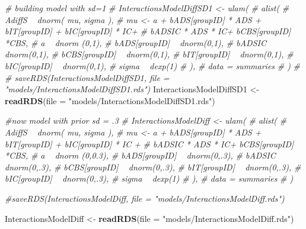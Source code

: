 \documentclass[10pt,dvipsnames,enabledeprecatedfontcommands]{scrartcl}
\newenvironment{Shaded}{\begin{snugshade}}{\end{snugshade}}
\newcommand{\KeywordTok}[1]{\textcolor[rgb]{0.13,0.29,0.53}{\textbf{#1}}}
\newcommand{\DataTypeTok}[1]{\textcolor[rgb]{0.13,0.29,0.53}{#1}}
\newcommand{\StringTok}[1]{\textcolor[rgb]{0.31,0.60,0.02}{#1}}
\newcommand{\CommentTok}[1]{\textcolor[rgb]{0.56,0.35,0.01}{\textit{#1}}}
\newcommand{\NormalTok}[1]{#1}
\begin{document}
\begin{Shaded}
\begin{Highlighting}[]
\CommentTok{# building model with sd=1}
\CommentTok{# InteractionsModelDiffSD1 <- ulam(}
\CommentTok{#   alist(}
\CommentTok{#     AdiffS ~ dnorm( mu, sigma ),}
\CommentTok{#     mu <- a + bADS[groupID] * ADS +  bIT[groupID] + bIC[groupID] * IC+}
\CommentTok{#     bADSIC * ADS * IC+ bCBS[groupID] *CBS,}
\CommentTok{#     a ~ dnorm (0,1),}
\CommentTok{#     bADS[groupID] ~ dnorm(0,1),}
\CommentTok{#     bADSIC ~ dnorm(0,1),}
\CommentTok{#     bCBS[groupID] ~ dnorm(0,1),}
\CommentTok{#     bIT[groupID] ~ dnorm(0,1),}
\CommentTok{#     bIC[groupID] ~ dnorm(0,1),}
\CommentTok{#     sigma  ~ dexp(1)}
\CommentTok{#   ), }
\CommentTok{#   data = summaries}
\CommentTok{# )}
\CommentTok{# }
\CommentTok{# saveRDS(InteractionsModelDiffSD1, file = "models/InteractionsModelDiffSD1.rds")}
\NormalTok{InteractionsModelDiffSD1 <-}\StringTok{ }\KeywordTok{readRDS}\NormalTok{(}\DataTypeTok{file =} \StringTok{"models/InteractionsModelDiffSD1.rds"}\NormalTok{)}


\CommentTok{#now model with prior sd = .3}
\CommentTok{# InteractionsModelDiff <- ulam(}
\CommentTok{#   alist(}
\CommentTok{#     AdiffS ~ dnorm( mu, sigma ),}
\CommentTok{#     mu <- a + bADS[groupID] * ADS +  bIT[groupID] + bIC[groupID] * IC +}
\CommentTok{#     bADSIC * ADS * IC+ bCBS[groupID] *CBS,}
\CommentTok{#     a ~ dnorm (0,0.3),}
\CommentTok{#     bADS[groupID] ~ dnorm(0,.3),}
\CommentTok{#     bADSIC ~ dnorm(0,.3),}
\CommentTok{#     bCBS[groupID] ~ dnorm(0,.3),}
\CommentTok{#     bIT[groupID] ~ dnorm(0,.3),}
\CommentTok{#     bIC[groupID] ~ dnorm(0,.3),}
\CommentTok{#     sigma  ~ dexp(1)}
\CommentTok{#   ), }
\CommentTok{#   data = summaries}
\CommentTok{# )}

\CommentTok{#saveRDS(InteractionsModelDiff, file = "models/InteractionsModelDiff.rds")}

\NormalTok{InteractionsModelDiff <-}\StringTok{ }\KeywordTok{readRDS}\NormalTok{(}\DataTypeTok{file =} \StringTok{"models/InteractionsModelDiff.rds"}\NormalTok{)}


\end{Highlighting}
\end{Shaded}
\end{document}
